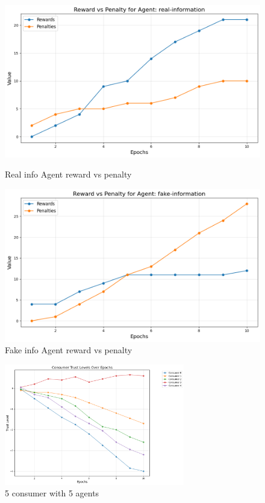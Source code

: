 \documentclass[twoside]{article}
\begin{document}
\begin{figure}[htbp]
     \centering
     \begin{minipage}[b]{0.45\textwidth}
         \centering
         \includegraphics[width=\textwidth]{../results/multi_real_agent/real_rp.png}
         \caption{Real info Agent reward vs penalty}
         \label{fig:image5}
     \end{minipage}
     \hfill
     \begin{minipage}[b]{0.45\textwidth}
         \centering
         \includegraphics[width=\textwidth]{../results/multi_real_agent/fake_rp.png}
         \caption{Fake info Agent reward vs penalty}
         \label{fig:image6}
     \end{minipage}
 \end{figure}

\begin{figure}[htbp]
     \centering
     \includegraphics[width=0.7\textwidth]{../results/multi_real_agent/consumertrust.png}
     \caption{5 consumer with 5 agents}
     \label{fig: 5 consumer, 5 agentss}
 \end{figure}
\end{document}
